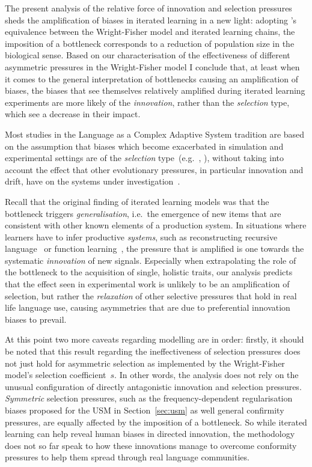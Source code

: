 The present analysis of the relative force of innovation and selection pressures sheds the amplification of biases in iterated learning in a new light: adopting \citeauthor{Reali2009}'s equivalence between the Wright-Fisher model and iterated learning chains, the imposition of a bottleneck corresponds to a reduction of population size in the biological sense. Based on our characterisation of the effectiveness of different asymmetric pressures in the Wright-Fisher model I conclude that, at least when it comes to the general interpretation of bottlenecks causing an amplification of biases, the biases that see themselves relatively amplified during iterated learning experiments are more likely of the \emph{innovation}, rather than the \emph{selection} type, which see a decrease in their impact. %

Most studies in the Language as a Complex Adaptive System tradition are based on the assumption that biases which become exacerbated in simulation and experimental settings are of the \emph{selection} type~(e.g.~\citealt[ch.6]{Kirby1999}, \citealt{Chater2010evolution}), without taking into account the effect that other evolutionary pressures, in particular innovation and drift, have on the systems under investigation~\citep[see][p.127-129]{Henrich2008}.

Recall that the original finding of iterated learning models was that the bottleneck triggers \emph{generalisation}, i.e.~the emergence of new items that are consistent with other known elements of a production system. In situations where learners have to infer productive \emph{systems}, such as reconstructing recursive language~\citep{Kirby2002} or function learning~\citep{Griffiths2013}, %
the pressure that is amplified is one towards the systematic \emph{innovation} of new signals.
Especially when extrapolating the role of the bottleneck to the acquisition of single, holistic traits, our analysis predicts that the effect seen in experimental work is unlikely to be an amplification of selection, but rather the \emph{relaxation} of other selective pressures that hold in real life language use, causing asymmetries that are due to preferential innovation biases to prevail.

At this point two more caveats regarding modelling are in order: firstly, it should be noted that this result regarding the ineffectiveness of selection pressures does not just hold for asymmetric selection as implemented by the Wright-Fisher model's selection coefficient~$s$. In other words, the analysis does not rely on the unusual configuration of directly antagonistic innovation and selection pressures. \emph{Symmetric} selection pressures, such as the frequency-dependent regularisation biases proposed for the USM in Section~\ref{sec:usm} as well general confirmity pressures, are equally affected by the imposition of a bottleneck. So while iterated learning can help reveal human biases in directed innovation, the methodology does not so far speak to how these innovations manage to overcome conformity pressures to help them spread through real language communities.

